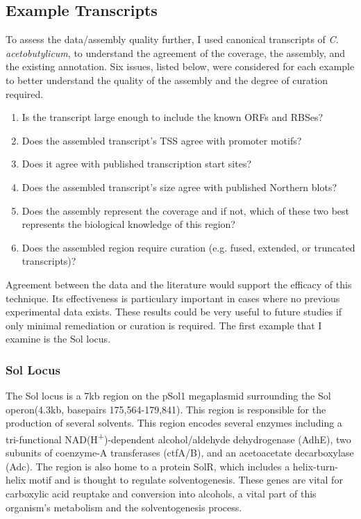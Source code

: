 \subsection{Example Transcripts}


To assess the data/assembly quality further, I used canonical transcripts of \textit{C. acetobutylicum}, to understand the agreement of the coverage, the assembly, and the existing annotation. Six issues, listed below, were considered for each example to better understand the quality of the assembly and the degree of curation required. 

\begin{enumerate}
\item Is the transcript large enough to include the known ORFs and RBSes?
\item Does the assembled transcript's TSS agree with promoter motifs?
\item Does it agree with published transcription start sites?
\item Does the assembled transcript's size agree with published Northern blots?
\item Does the assembly represent the coverage and if not, which of these two best represents the biological knowledge of this region?
\item Does the assembled region require curation (e.g. fused, extended, or truncated transcripts)?
\end{enumerate}

Agreement between the data and the literature would support the efficacy of this technique. Its effectiveness is particulary important in cases where no previous experimental data exists. These results could be very useful to future studies if only minimal remediation or curation is required. The first example that I examine is the Sol locus.

\subsubsection{Sol Locus}

The Sol locus is a 7kb region on the pSol1 megaplasmid surrounding the Sol operon(4.3kb, basepairs 175,564-179,841). This region is responsible for the production of several solvents\cite{62,63}. This region encodes several enzymes including a tri-functional NAD(H\textsuperscript{+})-dependent alcohol/aldehyde dehydrogenase (AdhE)\cite{62}, two subunits of coenzyme-A transferases (ctfA/B)\cite{66}, and an acetoacetate decarboxylase (Adc)\cite{64,65,66}. The region is also home to a protein SolR, which includes a helix-turn-helix motif and is thought to regulate solventogenesis\cite{67}. These genes are vital for carboxylic acid reuptake and conversion into alcohols, a vital part of this organism's metabolism and the solventogenesis process.

